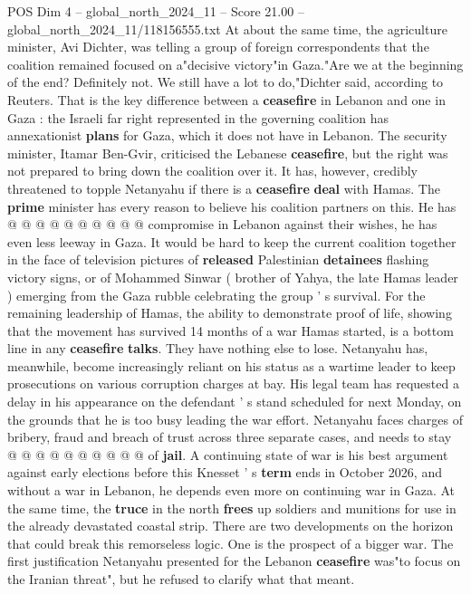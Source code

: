 \begin{textsample}{POS Dim 4 – global\_north\_2024\_11 – Score 21.00 – global\_north\_2024\_11/118156555.txt}
At about the same time, the agriculture minister, Avi Dichter, was telling a group of foreign correspondents that the coalition remained focused on a"decisive victory"in Gaza."Are we at the beginning of the end?
Definitely not.
We still have a lot to do,"Dichter said, according to Reuters.
That is the key difference between a \textbf{ceasefire} in Lebanon and one in Gaza : the Israeli far right represented in the governing coalition has annexationist \textbf{plans} for Gaza, which it does not have in Lebanon.
The security minister, Itamar Ben-Gvir, criticised the Lebanese \textbf{ceasefire}, but the right was not prepared to bring down the coalition over it.
It has, however, credibly threatened to topple Netanyahu if there is a \textbf{ceasefire} \textbf{deal} with Hamas.
The \textbf{prime} minister has every reason to believe his coalition partners on this.
He has @ @ @ @ @ @ @ @ @ @ compromise in Lebanon against their wishes, he has even less leeway in Gaza.
It would be hard to keep the current coalition together in the face of television pictures of \textbf{released} Palestinian \textbf{detainees} flashing victory signs, or of Mohammed Sinwar ( brother of Yahya, the late Hamas leader ) emerging from the Gaza rubble celebrating the group ' s survival.
For the remaining leadership of Hamas, the ability to demonstrate proof of life, showing that the movement has survived 14 months of a war Hamas started, is a bottom line in any \textbf{ceasefire} \textbf{talks}.
They have nothing else to lose.
Netanyahu has, meanwhile, become increasingly reliant on his status as a wartime leader to keep prosecutions on various corruption charges at bay.
His legal team has requested a delay in his appearance on the defendant ' s stand scheduled for next Monday, on the grounds that he is too busy leading the war effort.
Netanyahu faces charges of bribery, fraud and breach of trust across three separate cases, and needs to stay @ @ @ @ @ @ @ @ @ @ of \textbf{jail}.
A continuing state of war is his best argument against early elections before this Knesset ' s \textbf{term} ends in October 2026, and without a war in Lebanon, he depends even more on continuing war in Gaza.
At the same time, the \textbf{truce} in the north \textbf{frees} up soldiers and munitions for use in the already devastated coastal strip.
There are two developments on the horizon that could break this remorseless logic.
One is the prospect of a bigger war.
The first justification Netanyahu presented for the Lebanon \textbf{ceasefire} was"to focus on the Iranian threat", but he refused to clarify what that meant.

\end{textsample}
